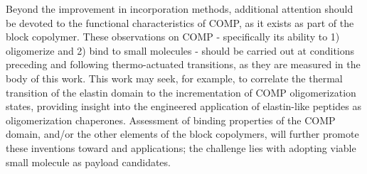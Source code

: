 \begin{refsection}
Beyond the improvement in incorporation methods, additional attention should be
devoted to the functional characteristics of COMP, as it exists as part of the
block copolymer. These observations on COMP - specifically its ability to 1)
oligomerize and 2) bind to small molecules - should be carried out at conditions
preceding and following thermo-actuated transitions, as they are measured in the
body of this work. This work may seek, for example, to correlate the thermal
transition of the elastin domain to the incrementation of COMP oligomerization
states, providing insight into the engineered application of elastin-like
peptides as oligomerization chaperones. Assessment of binding properties of the
COMP domain, and/or the other elements of the block copolymers, will further
promote these inventions toward  and 
applications; the challenge lies with adopting viable small molecule as payload
candidates.


\end{refsection}
